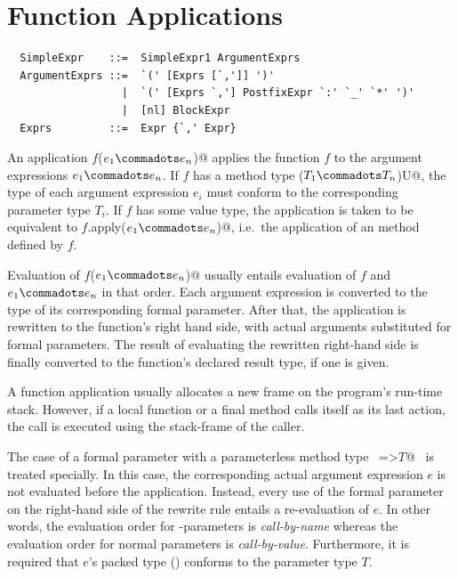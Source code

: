 \section{Function Applications}
\label{sec:apply}

\syntax\begin{lstlisting}
  SimpleExpr    ::=  SimpleExpr1 ArgumentExprs
  ArgumentExprs ::=  `(' [Exprs [`,']] ')'
                  |  `(' [Exprs `,'] PostfixExpr `:' `_' `*' ')'
                  |  [nl] BlockExpr
  Exprs         ::=  Expr {`,' Expr}
\end{lstlisting}

An application \lstinline@$f$($e_1 \commadots e_n$)@ applies the function $f$ to the
argument expressions $e_1 \commadots e_n$. If $f$ has a method type
\lstinline@($T_1 \commadots T_n$)U@, the type of each argument
expression $e_i$ must conform to the corresponding parameter type
$T_i$. If $f$ has some value type, the application is taken to be
equivalent to \lstinline@$f$.apply($e_1 \commadots e_n$)@, i.e.\ the
application of an  method defined by $f$.


Evaluation of \lstinline@$f$($e_1 \commadots e_n$)@ usually entails evaluation of
$f$ and $e_1 \commadots e_n$ in that order. Each argument expression
is converted to the type of its corresponding formal parameter.  After
that, the application is rewritten to the function's right hand side,
with actual arguments substituted for formal parameters.  The result
of evaluating the rewritten right-hand side is finally converted to
the function's declared result type, if one is given.

A function application usually allocates a new frame on the program's
run-time stack. However, if a local function or a final method calls
itself as its last action, the call is executed using the stack-frame
of the caller.

The case of a formal parameter with a parameterless
method type ~\lstinline@=>$T$@~ is treated specially. In this case, the
corresponding actual argument expression $e$ is not evaluated before the
application. Instead, every use of the formal parameter on the
right-hand side of the rewrite rule entails a re-evaluation of $e$. 
In other words, the evaluation order for
\code{=>}-parameters is {\em call-by-name} whereas the evaluation
order for normal parameters is {\em call-by-value}.
Furthermore, it is required that $e$'s packed type () 
conforms to the parameter type $T$. 

